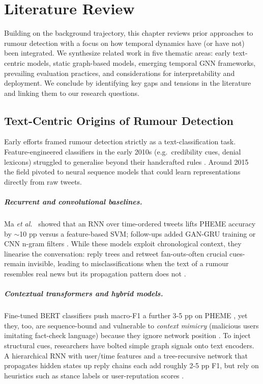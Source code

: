 \documentclass{cshonours}
\begin{document}
\chapter{Literature Review}\label{chap:literature}

Building on the background trajectory, this chapter reviews prior approaches to rumour detection with a focus on how temporal dynamics have (or have not) been integrated. We synthesize related work in five thematic areas: early text-centric models, static graph-based models, emerging temporal GNN frameworks, prevailing evaluation practices, and considerations for interpretability and deployment. We conclude by identifying key gaps and tensions in the literature and linking them to our research questions.


\section{Text-Centric Origins of Rumour Detection}
Early efforts framed rumour detection strictly as a text-classification task.  Feature-engineered classifiers in the early 2010s (e.g.\ credibility cues, denial lexicons) struggled to generalise beyond their handcrafted rules \cite{castillo2011credibility}.  Around 2015 the field pivoted to neural sequence models that could learn representations directly from raw tweets.

\paragraph{Recurrent and convolutional baselines.}  
Ma \textit{et al.}~\cite{ma2016detecting} showed that an RNN over time-ordered tweets lifts PHEME accuracy by \(\sim\)10 pp versus a feature-based SVM; follow-ups added GAN-GRU training \cite{ma2021temporal} or CNN n-gram filters \cite{yu2017cnn}.  While these models exploit chronological context, they linearise the conversation: reply trees and retweet fan-outs-often crucial cues-remain invisible, leading to misclassifications when the text of a rumour resembles real news but its propagation pattern does not \cite{zubiaga2018survey}.

\paragraph{Contextual transformers and hybrid models.}  
Fine-tuned BERT classifiers push macro-F1 a further 3-5 pp on PHEME \cite{liu2025enhancing}, yet they, too, are sequence-bound and vulnerable to \emph{context mimicry} (malicious users imitating fact-check language) because they ignore network position \cite{rahman2024primer}.  To inject structural cues, researchers have bolted simple graph signals onto text encoders.  A hierarchical RNN with user/time features \cite{guo2018hierarchical} and a tree-recursive network that propagates hidden states up reply chains \cite{ma2018rvnn} each add roughly 2-5 pp F1, but rely on heuristics such as stance labels or user-reputation scores \cite{lukasik2019stance}.
\end{document}
